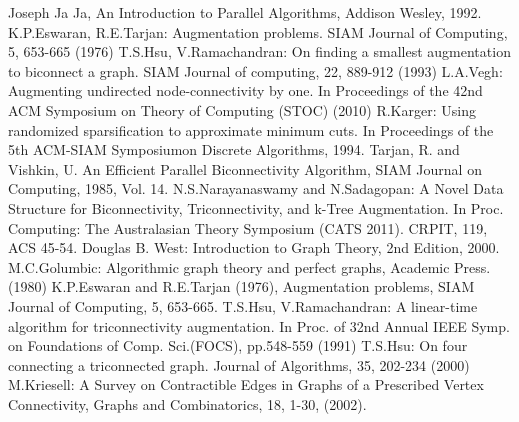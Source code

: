 \documentclass[runningheads]{llncs}
\begin{document}
\begin{thebibliography}{4}
Joseph Ja Ja, An Introduction to Parallel Algorithms,  Addison Wesley, 1992.
K.P.Eswaran, R.E.Tarjan: Augmentation problems. SIAM Journal of Computing, 5, 653-665 (1976)
T.S.Hsu, V.Ramachandran: On finding a smallest augmentation to biconnect a graph. SIAM Journal of computing, 22, 889-912 (1993)
L.A.Vegh: Augmenting undirected node-connectivity by one. In Proceedings of the 42nd ACM Symposium on Theory of Computing (STOC) (2010)
R.Karger: Using randomized sparsification to approximate minimum cuts. In Proceedings of the 5th ACM-SIAM Symposiumon Discrete Algorithms, 1994. 
Tarjan, R. and Vishkin, U. An Efficient Parallel Biconnectivity Algorithm, SIAM Journal on Computing, 1985, Vol. 14.
N.S.Narayanaswamy and N.Sadagopan: A Novel Data Structure for Biconnectivity, Triconnectivity, and k-Tree Augmentation. In Proc. Computing: The Australasian Theory Symposium (CATS 2011). CRPIT, 119, ACS 45-54. 
Douglas B. West: Introduction to Graph Theory, 2nd Edition, 2000.
M.C.Golumbic: Algorithmic graph theory and perfect graphs, Academic Press. (1980)
K.P.Eswaran and R.E.Tarjan (1976), Augmentation problems, SIAM Journal of Computing, 5, 653-665.
 T.S.Hsu, V.Ramachandran: A linear-time algorithm for triconnectivity augmentation. In Proc. of 32nd Annual IEEE Symp. on Foundations of Comp. Sci.(FOCS), pp.548-559 (1991)
 T.S.Hsu: On four connecting a triconnected graph. Journal of Algorithms, 35, 202-234 (2000)
 M.Kriesell: A Survey on Contractible Edges in Graphs of a Prescribed Vertex Connectivity, Graphs and Combinatorics, 18, 1-30, (2002). 
\end{thebibliography}
\end{document}
